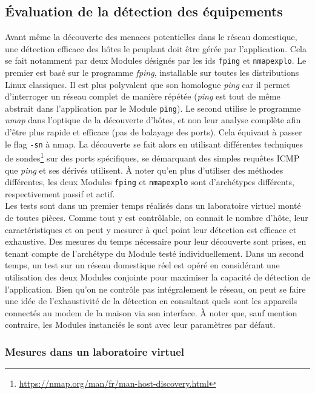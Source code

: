 \documentclass[]{article}
\begin{document}
\subsection{Évaluation de la détection des équipements}

Avant même la découverte des menaces potentielles dans le réseau domestique, une détection efficace des hôtes le peuplant doit être gérée par l'application. Cela se fait notamment par deux Modules désignés par les ids \texttt{fping} et \texttt{nmapexplo}. Le premier est basé sur le programme \textit{fping}, installable sur toutes les distributions Linux classiques. Il est plus polyvalent que son homologue \textit{ping} car il permet d'interroger un réseau complet de manière répétée (\textit{ping} est tout de même abstrait dans l'application par le Module \texttt{ping}). Le second utilise le programme \textit{nmap} dans l'optique de la découverte d'hôtes, et non leur analyse complète afin d'être plus rapide et efficace (pas de balayage des ports). Cela équivaut à passer le flag \texttt{-sn} à nmap. La découverte se fait alors en utilisant différentes techniques de sondes\footnote{\url{https://nmap.org/man/fr/man-host-discovery.html}} sur des ports spécifiques, se démarquant des simples requêtes ICMP que \textit{ping} et ses dérivés utilisent. À noter qu'en plus d'utiliser des méthodes différentes, les deux Modules \texttt{fping} et \texttt{nmapexplo} sont d'archétypes différents, respectivement passif et actif.\\

Les tests sont dans un premier temps réalisés dans un laboratoire virtuel monté de toutes pièces. Comme tout y est contrôlable, on connait le nombre d'hôte, leur caractéristiques et on peut y mesurer à quel point leur détection est efficace et exhaustive. Des mesures du temps nécessaire pour leur découverte sont prises, en tenant compte de l'archétype du Module testé individuellement. Dans un second temps, un test sur un réseau domestique réel est opéré en considérant une utilisation des deux Modules conjointe pour maximiser la capacité de détection de l'application. Bien qu'on ne contrôle pas intégralement le réseau, on peut se faire une idée de l'exhaustivité de la détection en consultant quels sont les appareils connectés au modem de la maison via son interface. À noter que, sauf mention contraire, les Modules instanciés le sont avec leur paramètres par défaut.  

\newpage

\subsubsection{Mesures dans un laboratoire virtuel}
\end{document}
